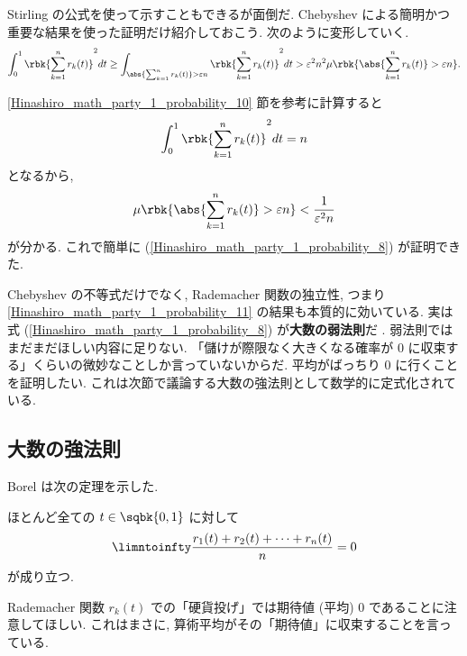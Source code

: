 \documentclass[openany, a4paper, oneside]{jsbook}
\begin{document}
Stirling の公式を使って示すこともできるが面倒だ.
Chebyshev による簡明かつ重要な結果を使った証明だけ紹介しておこう.
次のように変形していく.
\begin{align}
 \int_0^1 \rbk{\sum_{k=1}^n r_k (t)}^2 dt
 \geq
 \int_{\abs{\sum_{k=1}^n r_k (t)} > \varepsilon n} \rbk{\sum_{k=1}^n r_k (t)}^2 dt
 >
 \varepsilon^2 n^2 \mu \rbk{\abs{\sum_{k=1}^n r_k (t)} > \varepsilon n}.
\end{align}

\ref{Hinashiro_math_party_1_probability_10} 節を参考に計算すると
\begin{align}
 \int_0^1 \rbk{\sum_{k=1}^n r_k (t)}^2 dt = n
\end{align}
となるから,
\begin{align}
 \mu \rbk{\abs{\sum_{k=1}^n r_k (t)} > \varepsilon n}
 <
 \frac{1}{\varepsilon^2 n}
\end{align}
が分かる.
これで簡単に (\ref{Hinashiro_math_party_1_probability_8}) が証明できた.

Chebyshev の不等式だけでなく, Rademacher 関数の独立性, つまり \ref{Hinashiro_math_party_1_probability_11} の結果も本質的に効いている.
実は式 (\ref{Hinashiro_math_party_1_probability_8}) が\textbf{大数の弱法則}だ \footnotemark[56]{}.
弱法則ではまだまだほしい内容に足りない.
「儲けが際限なく大きくなる確率が 0 に収束する」くらいの微妙なことしか言っていないからだ.
平均がばっちり 0 に行くことを証明したい.
これは次節で議論する大数の強法則として数学的に定式化されている.


\subsection{大数の強法則}

Borel は次の定理を示した.
\begin{thm}[Borel]
 ほとんど全ての $t \in \sqbk{0, 1}$ に対して
 \begin{align}
  \limntoinfty \frac{r_1 (t) + r_2 (t) + \cdots + r_n (t)}{n} = 0
 \end{align}
 が成り立つ.
\end{thm}
Rademacher 関数 $r_k (t)$ での「硬貨投げ」では期待値 (平均) $0$ であることに注意してほしい.
これはまさに, 算術平均がその「期待値」に収束することを言っている.
\end{document}
